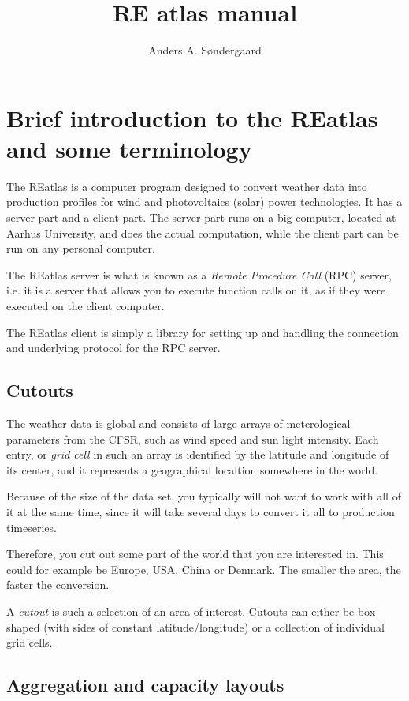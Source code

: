 \documentclass[a4paper,10pt]{article}
\title{RE atlas manual}
\author{Anders A. Søndergaard}
\begin{document}
\maketitle

\tableofcontents

\section{Brief introduction to the REatlas and some terminology}

The REatlas is a computer program designed to convert
weather data into production profiles for wind and photovoltaics (solar) power
technologies. It has a server part and a client part. The server part
runs on a big computer, located at Aarhus University, and does the actual computation, while the client
part can be run on any personal computer.

The REatlas server is what is known as a \emph{Remote Procedure Call} (RPC)
server, i.e. it is a server that allows you to execute function calls
on it, as if they were executed on the client computer.

The REatlas client is simply a library for setting up and handling
the connection and underlying protocol for the RPC server.

\subsection{Cutouts}

The weather data is global and consists of large arrays of meterological
parameters from the CFSR\cite{cfsr}, such as wind speed and sun light intensity.
Each entry, or \emph{grid cell} in such an array is identified by the latitude and longitude of its center, and it represents a
geographical localtion somewhere in the world.

Because of the size of the data set, you
typically will not want to work with all of it at the same time,
since it will take several days to convert it all to production timeseries.

Therefore, you cut out some part of the world that you are interested in.
This could for example be Europe, USA, China or Denmark.
The smaller the area, the faster the conversion.

A \emph{cutout} is such a selection of an area of interest. 
Cutouts can either be box shaped (with sides of constant latitude/longitude) or a collection of individual grid cells.

\subsection{Aggregation and capacity layouts}
\end{document}
